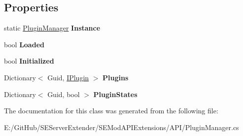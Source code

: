 \subsection*{Properties}
\begin{DoxyCompactItemize}
\item 
\hypertarget{class_s_e_mod_a_p_i_extensions_1_1_a_p_i_1_1_plugin_manager_af47c339f9d4c116870ee16944be5849e}{}static \hyperlink{class_s_e_mod_a_p_i_extensions_1_1_a_p_i_1_1_plugin_manager}{Plugin\+Manager} {\bfseries Instance}\label{class_s_e_mod_a_p_i_extensions_1_1_a_p_i_1_1_plugin_manager_af47c339f9d4c116870ee16944be5849e}

\item 
\hypertarget{class_s_e_mod_a_p_i_extensions_1_1_a_p_i_1_1_plugin_manager_abc049c877cc6cd15ef2674499f98bfbd}{}bool {\bfseries Loaded}\label{class_s_e_mod_a_p_i_extensions_1_1_a_p_i_1_1_plugin_manager_abc049c877cc6cd15ef2674499f98bfbd}

\item 
\hypertarget{class_s_e_mod_a_p_i_extensions_1_1_a_p_i_1_1_plugin_manager_a14fd79f81163e783efa536a11b612f66}{}bool {\bfseries Initialized}\label{class_s_e_mod_a_p_i_extensions_1_1_a_p_i_1_1_plugin_manager_a14fd79f81163e783efa536a11b612f66}

\item 
\hypertarget{class_s_e_mod_a_p_i_extensions_1_1_a_p_i_1_1_plugin_manager_aa7fc93cbd1cebc91bb1a2a7e82649f8f}{}Dictionary$<$ Guid, \hyperlink{interface_s_e_mod_a_p_i_extensions_1_1_a_p_i_1_1_plugin_1_1_i_plugin}{I\+Plugin} $>$ {\bfseries Plugins}\label{class_s_e_mod_a_p_i_extensions_1_1_a_p_i_1_1_plugin_manager_aa7fc93cbd1cebc91bb1a2a7e82649f8f}

\item 
\hypertarget{class_s_e_mod_a_p_i_extensions_1_1_a_p_i_1_1_plugin_manager_a117110d7c7fdc583732d8e012083fe4a}{}Dictionary$<$ Guid, bool $>$ {\bfseries Plugin\+States}\label{class_s_e_mod_a_p_i_extensions_1_1_a_p_i_1_1_plugin_manager_a117110d7c7fdc583732d8e012083fe4a}

\end{DoxyCompactItemize}


The documentation for this class was generated from the following file\+:\begin{DoxyCompactItemize}
\item 
E\+:/\+Git\+Hub/\+S\+E\+Server\+Extender/\+S\+E\+Mod\+A\+P\+I\+Extensions/\+A\+P\+I/Plugin\+Manager.\+cs\end{DoxyCompactItemize}
